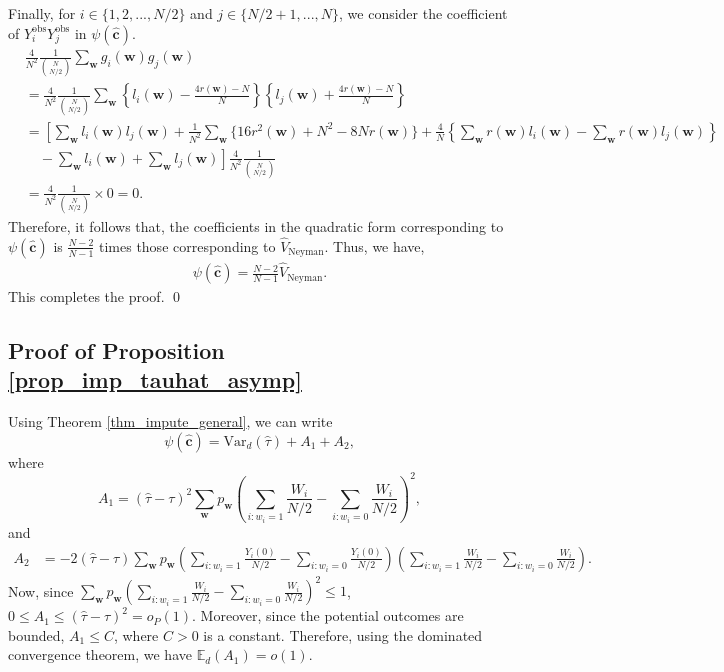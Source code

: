\documentclass[12pt]{article}
\newcommand{\Var}{{\text{Var}}}
\newcommand{\E}{{\mathbb{E}}}
\begin{document}
Finally, for $i \in \{1,2,...,N/2\}$ and $j \in \{N/2+1,...,N\}$, we consider the coefficient of $Y^{\text{obs}}_iY^{\text{obs}}_j$ in $\psi(\hat{\bm{c}})$.
\begin{align}
 &\frac{4}{N^2}\frac{1}{\binom{N}{N/2}}\sum_{\bm{w}} g_i(\bm{w})g_j(\bm{w}) \nonumber \\
 & = \frac{4}{N^2}\frac{1}{\binom{N}{N/2}}\sum_{\bm{w}}\left\{l_i(\bm{w}) - \frac{4r(\bm{w})-N}{N}   \right\}\left\{l_j(\bm{w}) + \frac{4r(\bm{w})-N}{N}   \right\} \nonumber \\
 & = \left[\sum_{\bm{w}}l_i(\bm{w})l_j(\bm{w}) + \frac{1}{N^2}\sum_{\bm{w}}\{16r^2(\bm{w}) + N^2 - 8Nr(\bm{w})\} + \frac{4}{N}\left\{\sum_{\bm{w}}r(\bm{w})l_i(\bm{w}) - \sum_{\bm{w}}r(\bm{w})l_j(\bm{w})\right\} \right. \nonumber \\
 &\quad - \left.\sum_{\bm{w}}l_i(\bm{w}) + \sum_{\bm{w}}l_j(\bm{w})\right]\frac{4}{N^2}\frac{1}{\binom{N}{N/2}} \nonumber \\
 & = \frac{4}{N^2}\frac{1}{\binom{N}{N/2}} \times 0 = 0.
\end{align}
Therefore, it follows that, the coefficients in the quadratic form corresponding to $\psi(\hat{\bm{c}})$ is $\frac{N-2}{N-1}$ times those corresponding to $\hat{V}_{\text{Neyman}}$. Thus, we have,
\begin{align}
    \psi(\hat{\bm{c}}) = \frac{N-2}{N-1}\hat{V}_{\text{Neyman}}.
\end{align}
This completes the proof.
\qed

\subsection{Proof of Proposition \ref{prop_imp_tauhat_asymp}}

Using Theorem \ref{thm_impute_general}, we can write
$$\psi(\hat{\bm{c}}) = \Var_d(\hat{\tau}) + A_1 + A_2,$$
where
$$A_1  = {(\hat{\tau} - \tau)^2}\sum_{\bm{w}}p_{\bm{w}}\left(\sum_{i:w_i = 1}\frac{W_i}{N/2} - \sum_{i:w_i = 0}\frac{W_i}{N/2}\right)^2,$$
and 
\begin{align*}
  A_2 & =   -2{(\hat{\tau} - \tau)}\sum_{\bm{w}}p_{\bm{w}} \left(\sum_{i:w_i = 1}\frac{Y_i(0)}{N/2} - \sum_{i:w_i = 0}\frac{Y_i(0)}{N/2} \right)\left(\sum_{i:w_i = 1}\frac{W_i}{N/2} - \sum_{i:w_i = 0}\frac{W_i}{N/2}\right).
\end{align*}
Now, since $\sum_{\bm{w}}p_{\bm{w}}\left(\sum_{i:w_i = 1}\frac{W_i}{N/2} - \sum_{i:w_i = 0}\frac{W_i}{N/2}\right)^2 \leq 1$, $0\leq A_1 \leq (\hat{\tau} - \tau)^2 = o_P(1)$. Moreover, since the potential outcomes are bounded, $A_1 \leq C$, where $C>0$ is a constant. Therefore, using the dominated convergence theorem, we have $\E_d(A_1) = o(1).$
\end{document}
